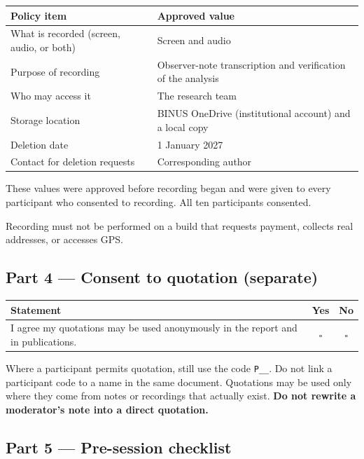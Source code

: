 \documentclass[]{interact}
\theoremstyle{plain}
\begin{document}
\begin{center}
\begin{tabular}{@{}p{}p{}@{}}
\toprule
\textbf{Policy item} & \textbf{Approved value} \\
\midrule
What is recorded (screen, audio, or both) & Screen and audio \\
Purpose of recording & Observer-note transcription and verification of the analysis \\
Who may access it & The research team \\
Storage location & BINUS OneDrive (institutional account) and a local copy \\
Deletion date & 1 January 2027 \\
Contact for deletion requests & Corresponding author \\
\bottomrule
\end{tabular}
\end{center}

\noindent These values were approved before recording began and were given to every participant who
consented to recording. All ten participants consented.

\noindent Recording must not be performed on a build that requests payment, collects real addresses, or
accesses GPS.

\subsection*{Part 4 --- Consent to quotation (separate)}

\begin{center}
\begin{tabular}{@{}p{}cc@{}}
\toprule
\textbf{Statement} & \textbf{Yes} & \textbf{No} \\
\midrule
I agree my quotations may be used anonymously in the report and in publications. & $\square$ & $\square$ \\
\bottomrule
\end{tabular}
\end{center}

\noindent Where a participant permits quotation, still use the code \texttt{P\_\_}. Do not link a
participant code to a name in the same document. Quotations may be used only where they come from notes
or recordings that actually exist. \textbf{Do not rewrite a moderator's note into a direct quotation.}

\subsection*{Part 5 --- Pre-session checklist}
\end{document}
